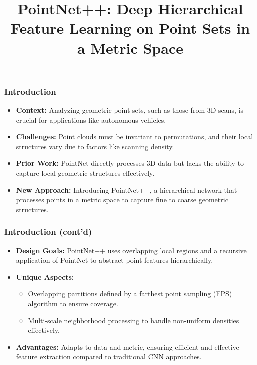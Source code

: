 \documentclass[11pt,xcolor={dvipsnames},hyperref={pdftex,pdfpagemode=UseNone,hidelinks,pdfdisplaydoctitle=true},usepdftitle=false]{beamer}
\begin{document}
\title{PointNet++: Deep Hierarchical Feature Learning on Point Sets in a Metric Space}
\frame{\titlepage}

\begin{frame}
\frametitle{Introduction}
\begin{itemize}
  \item \textbf{Context:} Analyzing geometric point sets, such as those from 3D scans, is crucial for applications like autonomous vehicles.
  \item \textbf{Challenges:} Point clouds must be invariant to permutations, and their local structures vary due to factors like scanning density.
  \item \textbf{Prior Work:} PointNet directly processes 3D data but lacks the ability to capture local geometric structures effectively.
  \item \textbf{New Approach:} Introducing PointNet++, a hierarchical network that processes points in a metric space to capture fine to coarse geometric structures.
\end{itemize}
\end{frame}

\begin{frame}
\frametitle{Introduction (cont'd)}
\begin{itemize}
  \item \textbf{Design Goals:} PointNet++ uses overlapping local regions and a recursive application of PointNet to abstract point features hierarchically.
  \item \textbf{Unique Aspects:}
    \begin{itemize}
      \item Overlapping partitions defined by a farthest point sampling (FPS) algorithm to ensure coverage.
      \item Multi-scale neighborhood processing to handle non-uniform densities effectively.
    \end{itemize}
  \item \textbf{Advantages:} Adapts to data and metric, ensuring efficient and effective feature extraction compared to traditional CNN approaches.
\end{itemize}
\end{frame}
\end{document}
